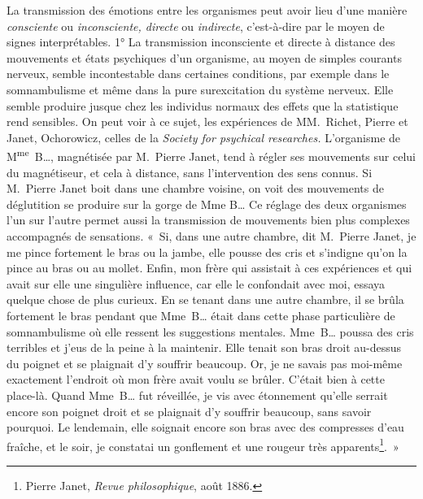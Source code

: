 \documentclass[french,twoside]{book} %
\begin{document}
La transmission des émotions entre les organismes peut avoir lieu d’une manière \emph{consciente} ou \emph{inconsciente, directe} ou \emph{indirecte}, c’est-à-dire par le moyen de signes interprétables. 1° La transmission inconsciente et directe à distance des mouvements et états psychiques d’un organisme, au moyen de simples courants nerveux, semble incontestable dans certaines conditions, par exemple dans le somnambulisme et même dans la pure surexcitation du système nerveux. Elle semble produire jusque chez les individus normaux des effets que la statistique rend sensibles. On peut voir à ce sujet, les expériences de MM. Richet, Pierre et Janet, Ochorowicz, celles de la \emph{Society for psychical researches.} L’organisme de M\textsuperscript{me} B…, magnétisée par M. Pierre Janet, tend à régler ses mouvements sur celui du magnétiseur, et cela à distance, sans l’intervention des sens connus. Si M. Pierre Janet boit dans une chambre voisine, on voit des mouvements de déglutition se produire sur la gorge de Mme B… Ce réglage des deux organismes l’un sur l’autre permet aussi la transmission de mouvements bien plus complexes accompagnés de sensations. « Si, dans une autre chambre, dit M. Pierre Janet, je me pince fortement le bras ou la jambe, elle pousse des cris et s’indigne qu’on la pince au bras ou au mollet. Enfin, mon frère qui assistait à ces expériences et qui avait sur elle une singulière influence, car elle le confondait avec moi, essaya quelque chose de plus curieux. En se tenant dans une autre chambre, il se brûla fortement le bras pendant que Mme B… était dans cette phase particulière de somnambulisme où elle ressent les suggestions mentales. Mme B… poussa des cris terribles et j’eus de la peine à la maintenir. Elle tenait son bras droit au-dessus du poignet et se plaignait d’y souffrir beaucoup. Or, je ne savais pas moi-même exactement l’endroit où mon frère avait voulu se brûler. C’était bien à cette place-là. Quand Mme B… fut réveillée, je vis avec étonnement qu’elle serrait encore son poignet droit et se plaignait d’y souffrir beaucoup, sans savoir pourquoi. Le lendemain, elle soignait encore son bras avec des compresses d’eau fraîche, et le soir, je constatai un gonflement et une rougeur très apparents\footnote{ Pierre Janet, \emph{Revue philosophique}, août 1886.}. »\par
\end{document}
